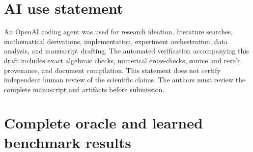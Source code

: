\documentclass{article}
\begin{document}
\section*{AI use statement}
An OpenAI coding agent was used for research ideation, literature searches, mathematical derivations, implementation, experiment orchestration, data analysis, and manuscript drafting. The automated verification accompanying this draft includes exact algebraic checks, numerical cross-checks, source and result provenance, and document compilation. This statement does not certify independent human review of the scientific claims. The authors must review the complete manuscript and artifacts before submission.



\appendix



\section{Complete oracle and learned benchmark results}\label{app:complete-original-experiments}









\end{document}
